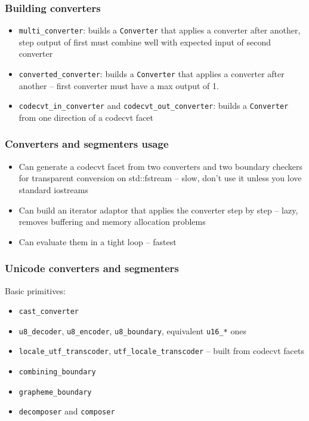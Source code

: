 \documentclass{beamer}
\begin{document}
\begin{frame}
	\frametitle{Building converters}
	
	\begin{itemize}
		\item \lstinline{multi_converter}: builds a \lstinline{Converter} that applies a converter after another, step output of first must combine well with expected input of second converter
		\item \lstinline{converted_converter}: builds a \lstinline{Converter} that applies a converter after another -- first converter must have a max output of 1.
		\item \lstinline{codecvt_in_converter} and \lstinline{codecvt_out_converter}: builds a \lstinline{Converter} from one direction of a codecvt facet
	\end{itemize}
	
\end{frame}

\begin{frame}
	\frametitle{Converters and segmenters usage}
	
	\begin{itemize}
		\item Can generate a codecvt facet from two converters and two boundary checkers for transparent conversion on std::fstream -- slow, don't use it unless you love standard iostreams
		\item Can build an iterator adaptor that applies the converter step by step -- lazy, removes buffering and memory allocation problems
		\item Can evaluate them in a tight loop -- fastest
	\end{itemize}
	
\end{frame}

\begin{frame}
	\frametitle{Unicode converters and segmenters}
	
	Basic primitives:
	\begin{itemize}
		\item \lstinline{cast_converter}
		\item \lstinline{u8_decoder}, \lstinline{u8_encoder}, \lstinline{u8_boundary}, equivalent \lstinline{u16_*} ones
		\item \lstinline{locale_utf_transcoder}, \lstinline{utf_locale_transcoder} -- built from codecvt facets
		\item \lstinline{combining_boundary}
		\item \lstinline{grapheme_boundary}
		\item \lstinline{decomposer} and \lstinline{composer}
	\end{itemize}
	
\end{frame}
\end{document}

